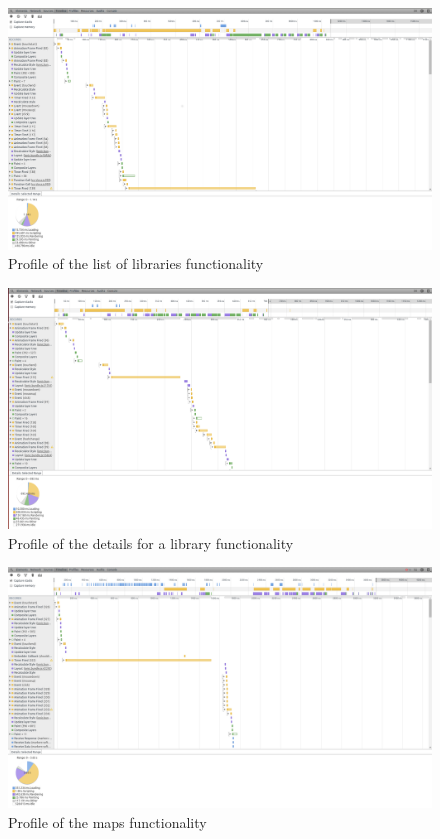 \documentclass{eplmastersthesis}
\begin{document}
\begin{figure}[H]
\centering
\includegraphics[scale = 0.15]{Images/libraries.png}
\caption{Profile of the list of libraries functionality}
\end{figure}
\begin{figure}[H]
\centering
\includegraphics[scale = 0.15]{Images/librarydetail.png}
\caption{Profile of the details for a library functionality}
\end{figure}
\begin{figure}[H]
\centering
\includegraphics[scale = 0.15]{Images/maps.png}
\caption{Profile of the maps functionality}
\end{figure}
\end{document}
